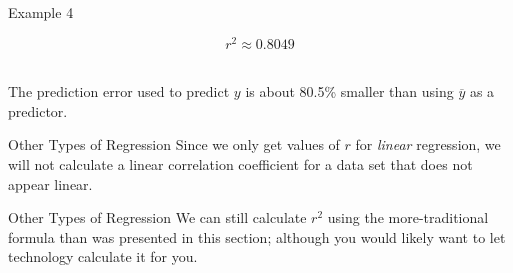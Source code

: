 \documentclass[t]{beamer}
\begin{document}
\begin{frame}{Example 4}
\begin{minipage}{0.3\textwidth}
\end{minipage}
\begin{minipage}{0.6\textwidth}
\[r^2 \approx 0.8049\]
\newline\\ \pause
\parbox{6cm}{
The prediction error used to predict $y$ is about 80.5\% smaller than using $\overline{y}$ as a predictor.}
\end{minipage}
\end{frame}

\begin{frame}{Other Types of Regression}
Since we only get values of $r$ for \emph{linear} regression, we will not calculate a linear correlation coefficient for a data set that does not appear linear. \newline\\		\pause

\begin{center}
\end{center}
\end{frame}

\begin{frame}{Other Types of Regression}
We can still calculate $r^2$ using the more-traditional formula than was presented in this section; although you would likely want to let technology calculate it for you.
\end{frame}
\end{document}
